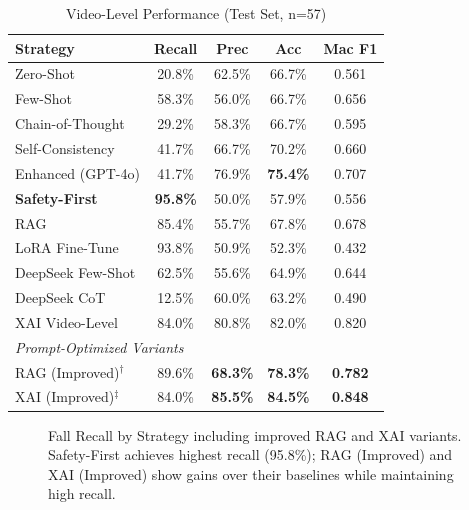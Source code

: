 \documentclass[conference]{IEEEtran}
\begin{document}
\begin{table}[!t]
\centering
\caption{Video-Level Performance (Test Set, n=57)}
\label{tab:main_results}
\begin{tabular}{lcccc}
\toprule
\textbf{Strategy} & \textbf{Recall} & \textbf{Prec} & \textbf{Acc} & \textbf{Mac F1} \\
\midrule
Zero-Shot & 20.8\% & 62.5\% & 66.7\% & 0.561 \\
Few-Shot & 58.3\% & 56.0\% & 66.7\% & 0.656 \\
Chain-of-Thought & 29.2\% & 58.3\% & 66.7\% & 0.595 \\
Self-Consistency & 41.7\% & 66.7\% & 70.2\% & 0.660 \\
Enhanced (GPT-4o) & 41.7\% & 76.9\% & \textbf{75.4\%} & 0.707 \\
\textbf{Safety-First} & \textbf{95.8\%} & 50.0\% & 57.9\% & 0.556 \\
RAG & 85.4\% & 55.7\% & 67.8\% & 0.678 \\
LoRA Fine-Tune & 93.8\% & 50.9\% & 52.3\% & 0.432 \\
DeepSeek Few-Shot & 62.5\% & 55.6\% & 64.9\% & 0.644 \\
DeepSeek CoT & 12.5\% & 60.0\% & 63.2\% & 0.490 \\
XAI Video-Level & 84.0\% & 80.8\% & 82.0\% & 0.820 \\
\midrule
\multicolumn{5}{l}{\textit{Prompt-Optimized Variants}} \\
\midrule
RAG (Improved)$^{\dagger}$ & 89.6\% & \textbf{68.3\%} & \textbf{78.3\%} & \textbf{0.782} \\
XAI (Improved)$^{\ddagger}$ & 84.0\% & \textbf{85.5\%} & \textbf{84.5\%} & \textbf{0.848} \\
\bottomrule
\end{tabular}
\end{table}

\begin{figure}[!t]
\centering
{}
\caption{Fall Recall by Strategy including improved RAG and XAI variants. Safety-First achieves highest recall (95.8\%); RAG (Improved) and XAI (Improved) show gains over their baselines while maintaining high recall.}
\label{fig:recall_comparison}
\end{figure}
\end{document}
